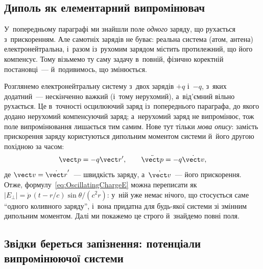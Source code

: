 \subsection*{Диполь як елементарний випромінювач}



У~попередньому параграфі ми знайшли поле \emph{одного} заряду, що рухається з~прискоренням. Але самотніх
зарядів не буває: реальна система (атом, антена) електронейтральна, і~разом із~рухомим зарядом містить
протилежний, що його компенсує. Тому візьмемо ту саму задачу в~повній, фізично коректній постановці~---
й~подивимось, що змінюється.

Розглянемо електронейтральну систему з~двох зарядів $+q$ і~$-q$, з~яких додатний~---
нескінченно важкий (і~тому нерухомий), а~від'ємний вільно рухається. Це в~точності осцилюючий заряд із~попереднього
параграфа, до якого додано нерухомий компенсуючий заряд; а~нерухомий заряд не випромінює, тож поле випромінювання
лишається тим самим. Нове тут тільки \emph{мова опису}: замість прискорення заряду користуються дипольним моментом системи
й~його другою похідною за часом:
\begin{equation*}
	\vect p = -q\vect r', \qquad \ddot{\vect p} = -q\dot{\vect v},
\end{equation*}
де $\vect v=\dot{\vect r}'$~--- швидкість заряду, а~$\dot{\vect v}$~--- його прискорення. Отже, формулу~\eqref{eq:OscillatingChargeE}
можна переписати як $|E_\perp|=\ddot p\,(t-r/c)\sin\theta/(c^2r)$: у~ній уже немає нічого, що стосується саме
\enquote{одного коливного заряду}, і~вона придатна для будь-якої системи зі змінним дипольним моментом.
Далі ми покажемо це строго й~знайдемо повні поля.




\subsection*{Звідки береться запізнення: потенціали випромінюючої системи}



